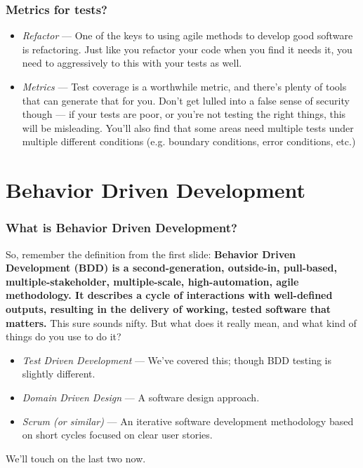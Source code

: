 \documentclass[t, 10pt]{beamer}
\begin{document}
\begin{frame}
\frametitle{Metrics for tests?}
\begin{itemize}
\item \textit{Refactor} --- One of the keys to using agile methods to develop good software is refactoring.  Just like you refactor your code when you find it needs it, you need to aggressively to this with your tests as well.
\item \textit{Metrics} --- Test coverage is a worthwhile metric, and there's plenty of tools that can generate that for you.  Don't get lulled into a false sense of security though --- if your tests are poor, or you're not testing the right things, this will be misleading.  You'll also find that some areas need multiple tests under multiple different conditions (e.g. boundary conditions, error conditions, etc.)
\end{itemize}
\end{frame}

\section{Behavior Driven Development}

\begin{frame}
\frametitle{What is Behavior Driven Development?}
So, remember the definition from the first slide:
\newline
\newline
\textbf{Behavior Driven Development (BDD) is a second-generation, outside-in, pull-based, multiple-stakeholder, multiple-scale, high-automation, agile methodology. It describes a cycle of interactions with well-defined outputs, resulting in the delivery of working, tested software that matters.}
\newline
\newline
This sure sounds nifty.  But what does it really mean, and what kind of things do you use to do it?
\begin{itemize}
\item \textit{Test Driven Development} --- We've covered this; though BDD testing is slightly different.
\item \textit{Domain Driven Design} --- A software design approach.
\item \textit{Scrum (or similar)} --- An iterative software development methodology based on short cycles focused on clear user stories.
\end{itemize}
We'll touch on the last two now.
\end{frame}
\end{document}
